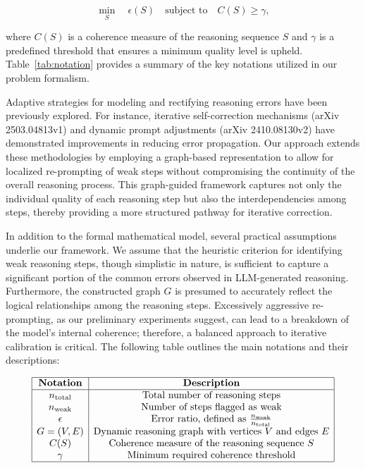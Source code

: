 \documentclass[11pt]{article}
\begin{document}
\[
\min_{S} \quad \epsilon(S) \quad \text{subject to} \quad C(S) \geq \gamma,
\]

where \(C(S)\) is a coherence measure of the reasoning sequence \(S\) and \(\gamma\) is a predefined threshold that ensures a minimum quality level is upheld. Table~\ref{tab:notation} provides a summary of the key notations utilized in our problem formalism.

Adaptive strategies for modeling and rectifying reasoning errors have been previously explored. For instance, iterative self-correction mechanisms (arXiv 2503.04813v1) and dynamic prompt adjustments (arXiv 2410.08130v2) have demonstrated improvements in reducing error propagation. Our approach extends these methodologies by employing a graph-based representation to allow for localized re-prompting of weak steps without compromising the continuity of the overall reasoning process. This graph-guided framework captures not only the individual quality of each reasoning step but also the interdependencies among steps, thereby providing a more structured pathway for iterative correction.

In addition to the formal mathematical model, several practical assumptions underlie our framework. We assume that the heuristic criterion for identifying weak reasoning steps, though simplistic in nature, is sufficient to capture a significant portion of the common errors observed in LLM-generated reasoning. Furthermore, the constructed graph \(G\) is presumed to accurately reflect the logical relationships among the reasoning steps. Excessively aggressive re-prompting, as our preliminary experiments suggest, can lead to a breakdown of the model's internal coherence; therefore, a balanced approach to iterative calibration is critical. The following table outlines the main notations and their descriptions:

\[
\begin{array}{|c|c|}
\hline
\textbf{Notation} & \textbf{Description} \\
\hline
n_{\text{total}} & \text{Total number of reasoning steps} \\
n_{\text{weak}} & \text{Number of steps flagged as weak} \\
\epsilon & \text{Error ratio, defined as } \frac{n_{\text{weak}}}{n_{\text{total}}} \\
G = (V, E) & \text{Dynamic reasoning graph with vertices } V \text{ and edges } E \\
C(S) & \text{Coherence measure of the reasoning sequence } S \\
\gamma & \text{Minimum required coherence threshold} \\
\hline
\end{array}
\]
\end{document}
